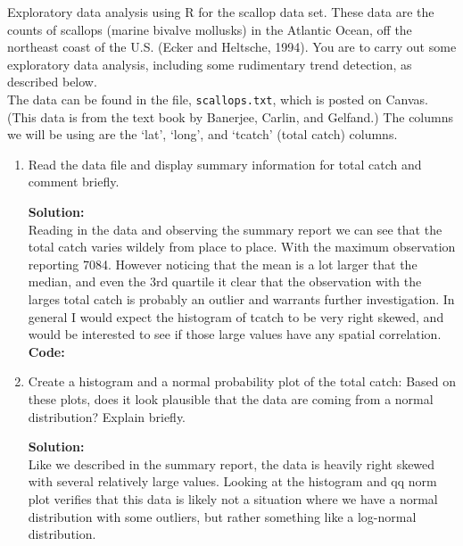 \documentclass[12pt]{article}
\makeatletter
\theoremstyle{homework}
\newenvironment{exercise}[1]
{\def\@currentlabel{#1}\exercisecore}
{\endexercisecore}
\newcommand{\localhead}[1]{\par\smallskip\noindent\textbf{#1}\nobreak\\}%
\newcommand\solution{\localhead{Solution:}}
\makeatother
\begin{document}
\begin{exercise}{1}Exploratory data analysis using R for the scallop data set.
  These data are the counts of scallops (marine bivalve mollusks) in the Atlantic Ocean, off
  the northeast coast of the U.S.  (Ecker and Heltsche, 1994).  You are
  to carry out some exploratory data analysis, including some rudimentary
  trend detection, as described below.\\

  The data can be found in the file, \verb+scallops.txt+, which is posted on
  Canvas.  (This data is from the text book by Banerjee, Carlin, and Gelfand.)
  The columns we will be using are the `lat', `long', and `tcatch' (total catch)
  columns. \\
  \begin{enumerate}
    \item Read the data file and display summary information for total catch and comment briefly.\\
    \solution Reading in the data and observing the summary report we can see that the total catch varies wildely from 
    place to place. With the maximum observation reporting 7084. However noticing that the mean is a lot larger that the median, and even the 3rd quartile 
    it clear that the observation with the larges total catch is probably an outlier and warrants further investigation. In general I would expect the histogram of
    tcatch to be very right skewed, and would be interested to see if those large values have any spatial correlation.\\
    \textbf{Code:}
        \begin{center}
        
        \end{center}
    \vspace{.15in}

    \item Create a histogram and a normal probability plot of the total catch: Based on these plots,
    does it look plausible that the data are coming from a normal distribution? Explain briefly. \\
    \solution Like we described in the summary report, the data is heavily right skewed with several relatively large values. 
    Looking at the histogram and qq norm plot verifies that this data is likely not a situation where we have a normal distribution with some outliers, but rather
    something like a log-normal distribution.


\end{enumerate}
\end{exercise}
\end{document}
